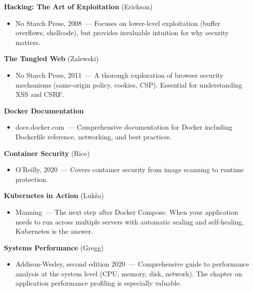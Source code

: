 \noindent{}\textbf{Hacking: The Art of Exploitation} (Erickson)

\begin{itemize}
\tightlist
\item
  No Starch Press, 2008~--- Focuses on lower-level exploitation (buffer overflows, shellcode), but provides invaluable intuition for why security matters.
\end{itemize}

\noindent{}\textbf{The Tangled Web} (Zalewski)

\begin{itemize}
\tightlist
\item
  No Starch Press, 2011~--- A thorough exploration of browser security mechanisms (same-origin policy, cookies, CSP). Essential for understanding XSS and CSRF.
\end{itemize}

\label{44-appendices:d6-docker-and-containers}

\textbf{Docker Documentation}

\begin{itemize}
\tightlist
\item
  docs.docker.com~--- Comprehensive documentation for Docker including Dockerfile reference, networking, and best practices.
\end{itemize}

\noindent{}\textbf{Container Security} (Rice)

\begin{itemize}
\tightlist
\item
  O'Reilly, 2020~--- Covers container security from image scanning to runtime protection.
\end{itemize}

\noindent{}\textbf{Kubernetes in Action} (Lukša)

\begin{itemize}
\tightlist
\item
  Manning~--- The next step after Docker Compose. When your application needs to run across multiple servers with automatic scaling and self-healing, Kubernetes is the answer.
\end{itemize}

\label{44-appendices:d7-performance}

\textbf{Systems Performance} (Gregg)

\begin{itemize}
\tightlist
\item
  Addison-Wesley, second edition 2020~--- Comprehensive guide to performance analysis at the system level (CPU, memory, disk, network). The chapter on application performance profiling is especially valuable.
\end{itemize}

